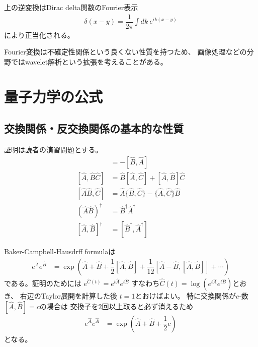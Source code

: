 上の逆変換はDirac delta関数のFourier表示
\begin{align}
    \delta(x-y) = \dfrac{1}{2\pi}\int dk\ e^{ik(x-y)}
\end{align}
により正当化される。

Fourier変換は不確定性関係という良くない性質を持つため、
画像処理などの分野ではwavelet解析という拡張を考えることがある。

\section{量子力学の公式}

\subsection{交換関係・反交換関係の基本的な性質}

証明は読者の演習問題とする。
\begin{align}
    [\hat{A}, \hat{B}] &= - [\hat{B}, \hat{A}]
\\
    [\hat{A}, \hat{B}\hat{C}]
   &=
   \hat{B}[\hat{A}, \hat{C}]
+
    [\hat{A}, \hat{B}] \hat{C}
\label{A,BC to B(A,C) + (A,B)C}
\\
    [\hat{A}\hat{B}, \hat{C}]
   &=
   \hat{A}\{\hat{B}, \hat{C}\}
-
    \{\hat{A}, \hat{C}\} \hat{B}
\\
    \left(\hat{A}\hat{B}\right)^\dagger
    &=
    \hat{B}^\dagger\hat{A}^\dagger
\\
    [\hat{A}, \hat{B}]^\dagger
    &=
    [\hat{B}^\dagger, \hat{A}^\dagger]
\end{align}

Baker-Campbell-Hausdrff formulaは
\begin{align}
    e^{\hat{A}} e^{\hat{B}}
    &=
    \exp\left(
        \hat{A} + \hat{B}
        + \dfrac{1}{2}[\hat{A},\hat{B}]
        + \dfrac{1}{12}[\hat{A} - \hat{B},[\hat{A},\hat{B}]]
        + \cdots
    \right)
\label{BCH formula}
\end{align}
である。証明のためには
$e^{\hat{C}(t)}
= e^{t\hat{A}} e^{t\hat{B}}$
すなわち$\hat{C}(t) = \log (
    e^{t\hat{A}} e^{t\hat{B}}
)$とおき、
右辺のTaylor展開を計算した後
$t=1$とおけばよい。
特に交換関係が$c$-数
$[\hat{A},\hat{B}]=c$の場合は
交換子を$2$回以上取ると必ず消えるため
\begin{align}
    e^{\hat{A}} e^{\hat{A}}
    &=
    \exp\left(
        \hat{A} + \hat{B}
        + \dfrac{1}{2}c
    \right)
\label{simpler BCH formula}    
\end{align}
となる。

